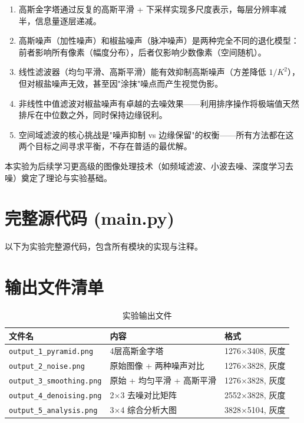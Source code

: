 \documentclass[12pt,a4paper]{ctexart}
\begin{document}
\begin{enumerate}[leftmargin=*]
    \item 高斯金字塔通过反复的高斯平滑 + 下采样实现多尺度表示，每层分辨率减半，信息量逐层递减。
    \item 高斯噪声（加性噪声）和椒盐噪声（脉冲噪声）是两种完全不同的退化模型：前者影响所有像素（幅度分布），后者仅影响少数像素（空间随机）。
    \item 线性滤波器（均匀平滑、高斯平滑）能有效抑制高斯噪声（方差降低 $1/K^2$），但对椒盐噪声无效，甚至因"涂抹"噪点而产生视觉伪影。
    \item 非线性中值滤波对椒盐噪声有卓越的去噪效果——利用排序操作将极端值天然排斥在中位数之外，同时保持边缘锐利。
    \item 空间域滤波的核心挑战是"噪声抑制 vs 边缘保留"的权衡——所有方法都在这两个目标之间寻求平衡，不存在普适的最优解。
\end{enumerate}

本实验为后续学习更高级的图像处理技术（如频域滤波、小波去噪、深度学习去噪）奠定了理论与实验基础。

\newpage

\appendix
\section{完整源代码 (main.py)}

以下为实验完整源代码，包含所有模块的实现与注释。



\section{输出文件清单}

\begin{table}[H]
    \centering
    \caption{实验输出文件}
    \begin{tabular}{lll}
        \toprule
        \textbf{文件名} & \textbf{内容} & \textbf{格式} \\
        \midrule
        \texttt{output\_1\_pyramid.png} & 4层高斯金字塔 & 1276$\times$3408, 灰度 \\
        \texttt{output\_2\_noise.png} & 原始图像 + 两种噪声对比 & 1276$\times$3828, 灰度 \\
        \texttt{output\_3\_smoothing.png} & 原始 + 均匀平滑 + 高斯平滑 & 1276$\times$3828, 灰度 \\
        \texttt{output\_4\_denoising.png} & 2$\times$3 去噪对比矩阵 & 2552$\times$3828, 灰度 \\
        \texttt{output\_5\_analysis.png} & 3$\times$4 综合分析大图 & 3828$\times$5104, 灰度 \\
        \bottomrule
    \end{tabular}
\end{table}
\end{document}
